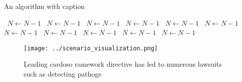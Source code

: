 \documentclass[a4paper]{article}
\begin{document}
\begin{algorithm}
\caption{An algorithm with caption}
\begin{algorithmic}
\    \State $N \gets N - 1$
\    \State $N \gets N - 1$
\    \State $N \gets N - 1$
\    \State $N \gets N - 1$
\    \State $N \gets N - 1$
\    \State $N \gets N - 1$
\    \State $N \gets N - 1$
\    \State $N \gets N - 1$
\    \State $N \gets N - 1$
\    \State $N \gets N - 1$
\    \State $N \gets N - 1$
\EndWhile
\end{algorithmic}
\end{algorithm}

\begin{figure}
\centering
\texttt{[image: ../scenario\_visualization.png]}
\caption{Leading cardoso ramework directive has led to numerous lawsuits such as detecting pathoge
}
\end{figure}
 
\end{document}
